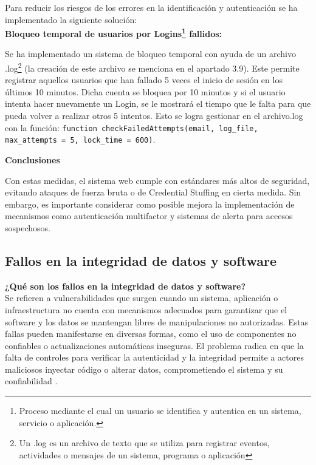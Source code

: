 \documentclass[a4paper,12pt]{article}
\newcommand{\code}[1]{\texttt{#1}}  %
\begin{document}
Para reducir los riesgos de los errores en la identificación y autenticación se ha implementado la siguiente solución:\\

\textbf{Bloqueo temporal de usuarios por Logins\footnote{Proceso mediante el cual un usuario se identifica y autentica en un sistema, servicio o aplicación.} fallidos:}

Se ha implementado un sistema de bloqueo temporal con ayuda de un archivo .log\footnote{Un .log es  un archivo de texto que se utiliza para registrar eventos, actividades o mensajes de un sistema, programa o aplicación} (la creación de este archivo se menciona en el apartado 3.9). Este permite registrar aquellos usuarios que han fallado 5 veces el inicio de sesión en los últimos 10 minutos. Dicha cuenta se bloquea por 10 minutos y si el usuario intenta hacer nuevamente un Login, se le mostrará el tiempo que le falta para que pueda volver a realizar otros 5 intentos. Esto se logra gestionar en el archivo.log con la función: \code{function checkFailedAttempts(email, log\_file, max\_attempts = 5, lock\_time = 600)}.




\vspace{1em}

\textbf{Conclusiones}

Con estas medidas, el sistema web cumple con estándares más altos de seguridad, evitando ataques de fuerza bruta o de Credential Stuffing en cierta medida. Sin embargo, es importante considerar como posible mejora la implementación de mecanismos como autenticación multifactor y sistemas de alerta para accesos sospechosos.

\vspace{1em}
\subsection{Fallos en la integridad de datos y software}
\vspace{1em}
\textbf{¿Qué son los fallos en la integridad de datos y software?\\}
Se refieren a vulnerabilidades que surgen cuando un sistema, aplicación o infraestructura no cuenta con mecanismos adecuados para garantizar que el software y los datos se mantengan libres de manipulaciones no autorizadas. Estas fallas pueden manifestarse en diversas formas, como el uso de componentes no confiables o actualizaciones automáticas inseguras. El problema radica en que la falta de controles para verificar la autenticidad y la integridad permite a actores maliciosos inyectar código o alterar datos, comprometiendo el sistema y su confiabilidad \cite{fallos_integ}.\\
\end{document}
